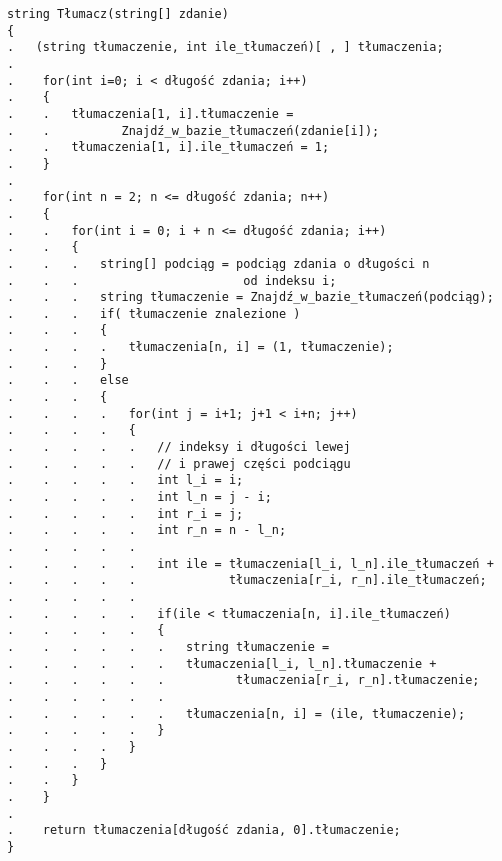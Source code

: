 \begin{verbatim}
string Tłumacz(string[] zdanie)
{
.   (string tłumaczenie, int ile_tłumaczeń)[ , ] tłumaczenia;
.    
.    for(int i=0; i < długość zdania; i++)
.    {
.    .   tłumaczenia[1, i].tłumaczenie = 
.    .          Znajdź_w_bazie_tłumaczeń(zdanie[i]);
.    .   tłumaczenia[1, i].ile_tłumaczeń = 1;
.    }
.    
.    for(int n = 2; n <= długość zdania; n++)
.    {
.    .   for(int i = 0; i + n <= długość zdania; i++)
.    .   {
.    .   .   string[] podciąg = podciąg zdania o długości n
.    .   .                       od indeksu i;
.    .   .   string tłumaczenie = Znajdź_w_bazie_tłumaczeń(podciąg);
.    .   .   if( tłumaczenie znalezione )
.    .   .   {
.    .   .   .   tłumaczenia[n, i] = (1, tłumaczenie);
.    .   .   }
.    .   .   else
.    .   .   {
.    .   .   .   for(int j = i+1; j+1 < i+n; j++)
.    .   .   .   {
.    .   .   .   .   // indeksy i długości lewej 
.    .   .   .   .   // i prawej części podciągu
.    .   .   .   .   int l_i = i;
.    .   .   .   .   int l_n = j - i; 
.    .   .   .   .   int r_i = j;
.    .   .   .   .   int r_n = n - l_n;
.    .   .   .   .   
.    .   .   .   .   int ile = tłumaczenia[l_i, l_n].ile_tłumaczeń +
.    .   .   .   .             tłumaczenia[r_i, r_n].ile_tłumaczeń;
.    .   .   .   .             
.    .   .   .   .   if(ile < tłumaczenia[n, i].ile_tłumaczeń)
.    .   .   .   .   {
.    .   .   .   .   .   string tłumaczenie =  
.    .   .   .   .   .   tłumaczenia[l_i, l_n].tłumaczenie +
.    .   .   .   .   .          tłumaczenia[r_i, r_n].tłumaczenie;
.    .   .   .   .   .   
.    .   .   .   .   .   tłumaczenia[n, i] = (ile, tłumaczenie);
.    .   .   .   .   }
.    .   .   .   }
.    .   .   }
.    .   }
.    }
.    
.    return tłumaczenia[długość zdania, 0].tłumaczenie;
}
\end{verbatim}